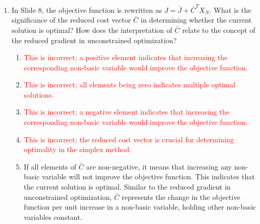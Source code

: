 \documentclass{article}%
\newcommand{\incorrect}[1]{\textcolor{red}{#1}}
\begin{document}
\begin{enumerate}
\begin{enumerate}
\begin{enumerate}
\item Partitioning $X$ into basic and non-basic variables allows us to rewrite the constraint equation $ \begin{bmatrix} A & I \end{bmatrix} \begin{bmatrix} X \\ W \end{bmatrix} = b $ as $ BX_B + NX_N = b $, where $B$ contains the columns of $ \begin{bmatrix} A & I \end{bmatrix} $ corresponding to basic variables and $N$ contains the columns corresponding to non-basic variables.  This separates the variables into a dependent set ($X_B$, determined by $X_N$) and an independent set ($X_N$).%
\item \incorrect{The number of variables remains the same; the simplification is in how they are handled algebraically.}%
\item \incorrect{Gaussian elimination can be used, but the partitioning simplifies the application of Gaussian elimination.}%
\item \incorrect{The partitioning is fundamental to the matrix representation of the simplex method.}%
\end{enumerate}%
\vspace{0.5em}%
\item In Slide 8, the objective function is rewritten as $ J = \bar{J} + \bar{C}^T X_N $. What is the significance of the reduced cost vector $ \bar{C} $ in determining whether the current solution is optimal?  How does the interpretation of $ \bar{C} $ relate to the concept of the reduced gradient in unconstrained optimization?%
\begin{enumerate}%
\item \incorrect{This is incorrect; a positive element indicates that increasing the corresponding non-basic variable would improve the objective function.}%
\item \incorrect{This is incorrect; all elements being zero indicates multiple optimal solutions.}%
\item \incorrect{This is incorrect; a negative element indicates that increasing the corresponding non-basic variable would improve the objective function.}%
\item \incorrect{This is incorrect; the reduced cost vector is crucial for determining optimality in the simplex method.}%
\item If all elements of $ \bar{C} $ are non-negative, it means that increasing any non-basic variable will not improve the objective function. This indicates that the current solution is optimal.  Similar to the reduced gradient in unconstrained optimization, $ \bar{C} $ represents the change in the objective function per unit increase in a non-basic variable, holding other non-basic variables constant.%
\end{enumerate}%
\vspace{0.5em}%
\end{enumerate}%
\end{enumerate}

%
\end{document}
